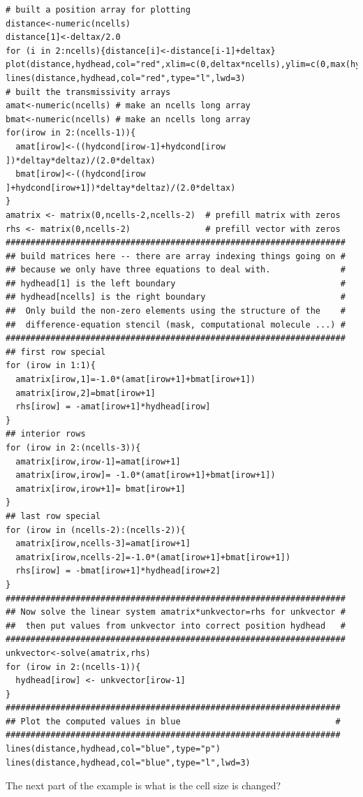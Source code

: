 \begin{lstlisting}
# built a position array for plotting
distance<-numeric(ncells)
distance[1]<-deltax/2.0
for (i in 2:ncells){distance[i]<-distance[i-1]+deltax}
plot(distance,hydhead,col="red",xlim=c(0,deltax*ncells),ylim=c(0,max(hydhead)*2.0),pch=21,tck=1)
lines(distance,hydhead,col="red",type="l",lwd=3)
# built the transmissivity arrays
amat<-numeric(ncells) # make an ncells long array
bmat<-numeric(ncells) # make an ncells long array
for(irow in 2:(ncells-1)){
  amat[irow]<-((hydcond[irow-1]+hydcond[irow  ])*deltay*deltaz)/(2.0*deltax)
  bmat[irow]<-((hydcond[irow  ]+hydcond[irow+1])*deltay*deltaz)/(2.0*deltax)
}
amatrix <- matrix(0,ncells-2,ncells-2)  # prefill matrix with zeros
rhs <- matrix(0,ncells-2)               # prefill vector with zeros
####################################################################
## build matrices here -- there are array indexing things going on #
## because we only have three equations to deal with.              #
## hydhead[1] is the left boundary                                 #
## hydhead[ncells] is the right boundary                           #
##  Only build the non-zero elements using the structure of the    #
##  difference-equation stencil (mask, computational molecule ...) #
####################################################################
## first row special
for (irow in 1:1){
  amatrix[irow,1]=-1.0*(amat[irow+1]+bmat[irow+1])
  amatrix[irow,2]=bmat[irow+1]
  rhs[irow] = -amat[irow+1]*hydhead[irow]
}
## interior rows
for (irow in 2:(ncells-3)){
  amatrix[irow,irow-1]=amat[irow+1] 
  amatrix[irow,irow]= -1.0*(amat[irow+1]+bmat[irow+1])
  amatrix[irow,irow+1]= bmat[irow+1]
}
## last row special
for (irow in (ncells-2):(ncells-2)){
  amatrix[irow,ncells-3]=amat[irow+1] 
  amatrix[irow,ncells-2]=-1.0*(amat[irow+1]+bmat[irow+1])
  rhs[irow] = -bmat[irow+1]*hydhead[irow+2]
}
####################################################################
## Now solve the linear system amatrix*unkvector=rhs for unkvector #
##  then put values from unkvector into correct position hydhead   #
####################################################################
unkvector<-solve(amatrix,rhs)
for (irow in 2:(ncells-1)){
  hydhead[irow] <- unkvector[irow-1]
}
###################################################################
## Plot the computed values in blue                               #
###################################################################
lines(distance,hydhead,col="blue",type="p")
lines(distance,hydhead,col="blue",type="l",lwd=3)
\end{lstlisting}
\clearpage
The next part of the example is what is the cell size is changed?  
